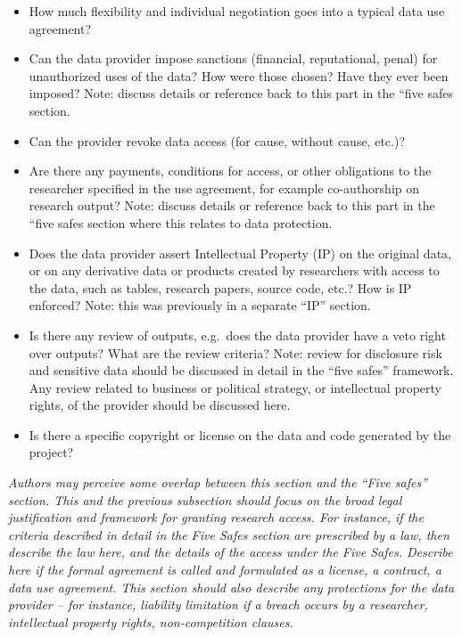 \documentclass[
]{book}
\providecommand{\tightlist}{%
  \setlength{\itemsep}{0pt}\setlength{\parskip}{0pt}}
\begin{document}
\begin{itemize}
\tightlist
\item
  How much flexibility and individual negotiation goes into a typical data use agreement?
\item
  Can the data provider impose sanctions (financial, reputational, penal) for unauthorized uses of the data? How were those chosen? Have they ever been imposed? Note: discuss details or reference back to this part in the ``five safes section.
\item
  Can the provider revoke data access (for cause, without cause, etc.)?
\item
  Are there any payments, conditions for access, or other obligations to the researcher specified in the use agreement, for example co-authorship on research output? Note: discuss details or reference back to this part in the ``five safes section where this relates to data protection.
\item
  Does the data provider assert Intellectual Property (IP) on the original data, or on any derivative data or products created by researchers with access to the data, such as tables, research papers, source code, etc.? How is IP enforced? Note: this was previously in a separate ``IP'' section.
\item
  Is there any review of outputs, e.g.~does the data provider have a veto right over outputs? What are the review criteria? Note: review for disclosure risk and sensitive data should be discussed in detail in the ``five safes'' framework. Any review related to business or political strategy, or intellectual property rights, of the provider should be discussed here.
\item
  Is there a specific copyright or license on the data and code generated by the project?
\end{itemize}

\emph{Authors may perceive some overlap between this section and the ``Five safes'' section. This and the previous subsection should focus on the broad legal justification and framework for granting research access. For instance, if the criteria described in detail in the Five Safes section are prescribed by a law, then describe the law here, and the details of the access under the Five Safes. Describe here if the formal agreement is called and formulated as a license, a contract, a data use agreement. This section should also describe any protections for the data provider -- for instance, liability limitation if a breach occurs by a researcher, intellectual property rights, non-competition clauses.}
\end{document}

